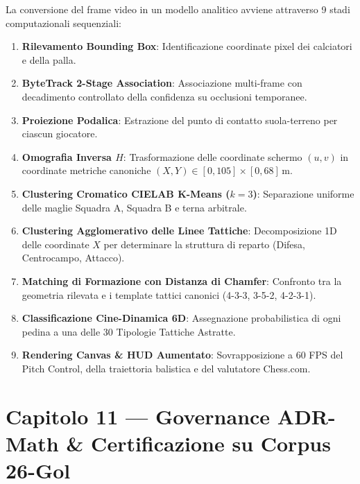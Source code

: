\documentclass[11pt,a4paper]{article}
\begin{document}
La conversione del frame video in un modello analitico avviene attraverso 9 stadi computazionali sequenziali:
\begin{enumerate}[label=\textbf{Stadio \arabic*}:]
    \item \textbf{Rilevamento Bounding Box}: Identificazione coordinate pixel dei calciatori e della palla.
    \item \textbf{ByteTrack 2-Stage Association}: Associazione multi-frame con decadimento controllato della confidenza su occlusioni temporanee.
    \item \textbf{Proiezione Podalica}: Estrazione del punto di contatto suola-terreno per ciascun giocatore.
    \item \textbf{Omografia Inversa $H$}: Trasformazione delle coordinate schermo $(u, v)$ in coordinate metriche canoniche $(X, Y) \in [0, 105] \times [0, 68]\,\text{m}$.
    \item \textbf{Clustering Cromatico CIELAB K-Means ($k=3$)}: Separazione uniforme delle maglie Squadra A, Squadra B e terna arbitrale.
    \item \textbf{Clustering Agglomerativo delle Linee Tattiche}: Decomposizione 1D delle coordinate $X$ per determinare la struttura di reparto (Difesa, Centrocampo, Attacco).
    \item \textbf{Matching di Formazione con Distanza di Chamfer}: Confronto tra la geometria rilevata e i template tattici canonici (4-3-3, 3-5-2, 4-2-3-1).
    \item \textbf{Classificazione Cine-Dinamica 6D}: Assegnazione probabilistica di ogni pedina a una delle 30 Tipologie Tattiche Astratte.
    \item \textbf{Rendering Canvas \& HUD Aumentato}: Sovrapposizione a 60 FPS del Pitch Control, della traiettoria balistica e del valutatore Chess.com.
\end{enumerate}


\section{Capitolo 11 — Governance ADR-Math \& Certificazione su Corpus 26-Gol}
\end{document}
